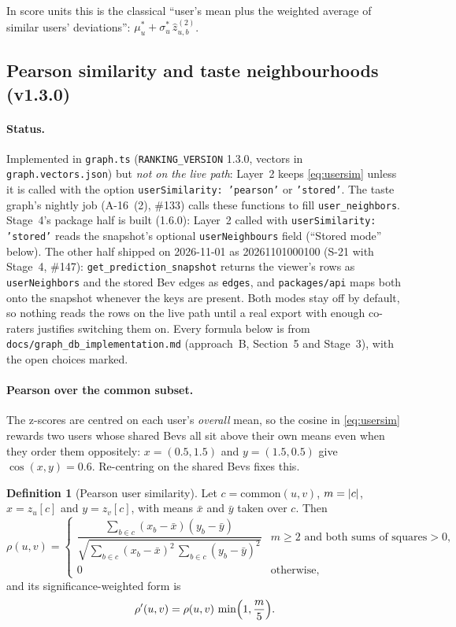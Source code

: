 \documentclass[11pt]{article}
\DeclarePairedDelimiter\abs{\lvert}{\rvert}
\DeclareMathOperator{\cosim}{cos}
\newcommand{\code}[1]{\texttt{#1}}
\newcommand{\zhat}{\hat{z}}
\theoremstyle{plain}
\theoremstyle{definition}
\newtheorem{definition}[theorem]{Definition}
\theoremstyle{remark}
\begin{document}
In score units this is the classical ``user's mean plus the weighted average of similar users' deviations'': $\mu^\ast_u + \sigma^\ast_u\,\zhat^{(2)}_{u,b}$.

\subsection{Pearson similarity and taste neighbourhoods (v1.3.0)}\label{sec:tastegraph}

\paragraph{Status.} Implemented in \code{graph.ts} (\code{RANKING\_VERSION} 1.3.0, vectors in \code{graph.vectors.json}) but \emph{not on the live path}: Layer~2 keeps \eqref{eq:usersim} unless it is called with the option \code{userSimilarity: 'pearson'} or \code{'stored'}. The taste graph's nightly job (A-16~(2), \#133) calls these functions to fill \code{user\_neighbors}. Stage~4's package half is built (1.6.0): Layer~2 called with \code{userSimilarity: 'stored'} reads the snapshot's optional \code{userNeighbours} field (``Stored mode'' below). The other half shipped on 2026-11-01 as 20261101000100 (S-21 with Stage~4, \#147): \code{get\_prediction\_snapshot} returns the viewer's rows as \code{userNeighbors} and the stored Bev edges as \code{edges}, and \code{packages/api} maps both onto the snapshot whenever the keys are present. Both modes stay off by default, so nothing reads the rows on the live path until a real export with enough co-raters justifies switching them on. Every formula below is from \code{docs/graph\_db\_implementation.md} (approach~B, Section~5 and Stage~3), with the open choices marked.

\paragraph{Pearson over the common subset.} The z-scores are centred on each user's \emph{overall} mean, so the cosine in \eqref{eq:usersim} rewards two users whose shared Bevs all sit above their own means even when they order them oppositely: $x = (0.5, 1.5)$ and $y = (1.5, 0.5)$ give $\cosim(x, y) = 0.6$. Re-centring on the shared Bevs fixes this.

\begin{definition}[Pearson user similarity]\label{def:pearson}
Let $c = \mathrm{common}(u, v)$, $m = \abs{c}$, $x = z_u[c]$ and $y = z_v[c]$, with means $\bar x$ and $\bar y$ taken over $c$. Then
\begin{equation}\label{eq:pearson}
\rho(u, v) =
\begin{cases}
\dfrac{\sum_{b \in c} (x_b - \bar x)(y_b - \bar y)}{\sqrt{\sum_{b \in c} (x_b - \bar x)^2\, \sum_{b \in c} (y_b - \bar y)^2}} & m \ge 2 \text{ and both sums of squares} > 0, \\[10pt]
0 & \text{otherwise,}
\end{cases}
\end{equation}
and its significance-weighted form is
\[
\rho'(u, v) = \rho(u, v)\, \min\Bigl(1, \frac{m}{5}\Bigr).
\]
\end{definition}
\end{document}
